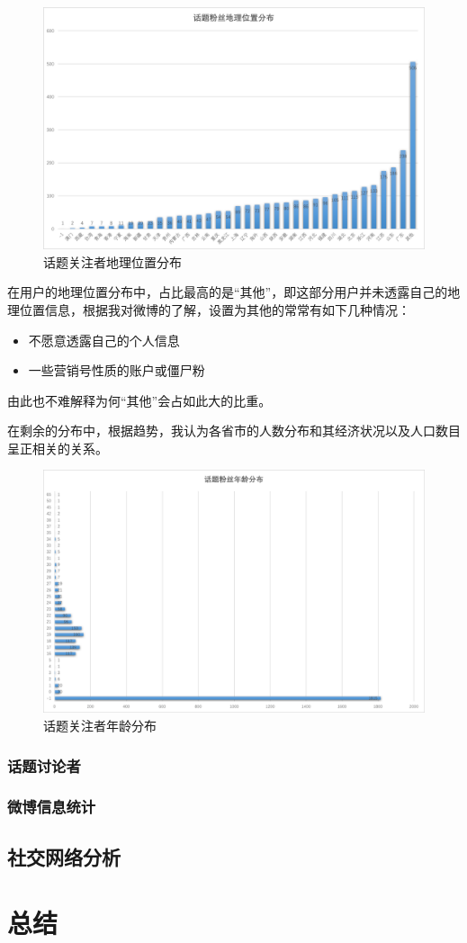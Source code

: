 \documentclass[a4paper,UTF8]{ctexart}
\begin{document}
\begin{figure}[H]
      \centering
      \includegraphics[width = \textwidth]{img/followers_location.png}
      \caption{话题关注者地理位置分布}
\end{figure}

在用户的地理位置分布中，占比最高的是“其他”，即这部分用户并未透露自己的地理位置信息，根据我对微博的了解，设置为其他的常常有如下几种情况：
\begin{itemize}
      \item 不愿意透露自己的个人信息
      \item 一些营销号性质的账户或僵尸粉
\end{itemize}
由此也不难解释为何“其他”会占如此大的比重。

在剩余的分布中，根据趋势，我认为各省市的人数分布和其经济状况以及人口数目呈正相关的关系。

\begin{figure}[H]
      \centering
      \includegraphics[width = \textwidth]{img/followers_age.png}
      \caption{话题关注者年龄分布}
\end{figure}

\subsubsection{话题讨论者}

\subsubsection{微博信息统计}

\subsection{社交网络分析}


\section{总结}
\end{document}
